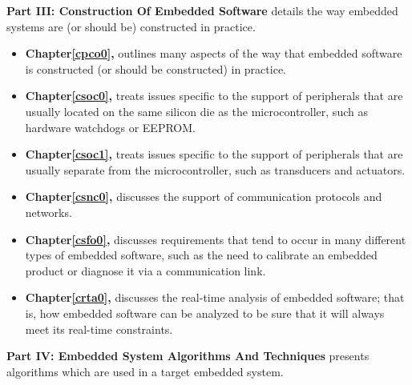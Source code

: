 \documentclass[letterpaper,10pt,titlepage]{custbook}
\begin{document}
\textbf{Part III:  Construction Of Embedded Software}
details the way embedded systems are (or should be)
constructed in practice.
\begin{itemize}
\item \textbf{Chapter\;\ref{cpco0}, \cpcozerotitle{}} outlines many aspects of
      the way that embedded software is constructed (or should be constructed) 
      in practice.

\item \textbf{Chapter\;\ref{csoc0}, \csoczerotitle{}} treats issues specific to 
      the support of peripherals that are usually located on the same silicon
      die as the microcontroller, such as hardware watchdogs or EEPROM.

\item \textbf{Chapter\;\ref{csoc1}, \csoconetitle{}} treats issues specific to 
      the support of peripherals that are usually separate from the microcontroller,
      such as transducers and actuators.

\item \textbf{Chapter\;\ref{csnc0}, \csnczerotitle{}} discusses the support
      of communication protocols and networks.

\item \textbf{Chapter\;\ref{csfo0}, \csfozerotitle{}} discusses requirements
      that tend to occur in many different types of embedded software,
      such as the need to calibrate an embedded product or diagnose it
      via a communication link.

\item \textbf{Chapter\;\ref{crta0}, \crtazerotitle{}} discusses the real-time
      analysis of embedded software; that is, how embedded software can be
      analyzed to be sure that it will always meet its real-time constraints.
\end{itemize}


\textbf{Part IV:  Embedded System Algorithms And Techniques}
presents algorithms which are used in a target embedded system.
\end{document}
